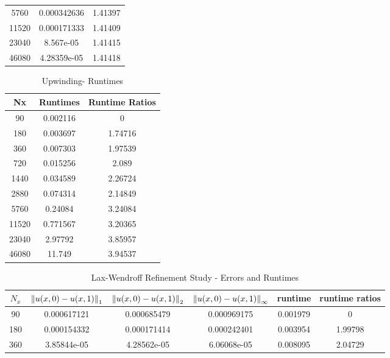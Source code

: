 \documentclass[12pt]{article}
\begin{document}
\begin{enumerate}[(a)]
\begin{minipage}{0.5\textwidth}
\begin{table}[H]
\begin{tabular}{||c|cc||}
  5760 &      0.000342636 &  1.41397 \\
 11520 &      0.000171333 &  1.41409 \\
 23040 &      8.567e-05   &  1.41415 \\
 46080 &      4.28359e-05 &  1.41418 \\
\hline \hline
\end{tabular}
\end{table}
\end{minipage}%
\begin{minipage}{0.5\textwidth}
\begin{table}[H]
\caption{Upwinding- Runtimes}
\centering\begin{tabular}{||c|cc||}
\hline \hline
    Nx &   Runtimes &   Runtime Ratios \\
\hline
    90 &   0.002116 &          0       \\
   180 &   0.003697 &          1.74716 \\
   360 &   0.007303 &          1.97539 \\
   720 &   0.015256 &          2.089   \\
  1440 &   0.034589 &          2.26724 \\
  2880 &   0.074314 &          2.14849 \\
  5760 &   0.24084  &          3.24084 \\
 11520 &   0.771567 &          3.20365 \\
 23040 &   2.97792  &          3.85957 \\
 46080 &  11.749    &          3.94537 \\
\hline
\end{tabular}
\end{table}
\end{minipage}
\begin{table}[H]
\caption{Lax-Wendroff Refinement Study - Errors and Runtimes}
\begin{tabular}{||c|ccc|cc||}
\hline \hline
    $N_x$ & $\norm{u(x,0)-u(x,1)}_1$ & $\norm{u(x,0)-u(x,1)}_2$ & $\norm{u(x,0)-u(x,1)}_{\infty}$ &   runtime &   runtime ratios \\
\hline
    90 &    0.000617121 &    0.000685479 &      0.000969175 &  0.001979 &          0       \\
   180 &    0.000154332 &    0.000171414 &      0.000242401 &  0.003954 &          1.99798 \\
   360 &    3.85844e-05 &    4.28562e-05 &      6.06068e-05 &  0.008095 &          2.04729 \\

\end{tabular}
\end{table}
\end{enumerate}
\end{document}
